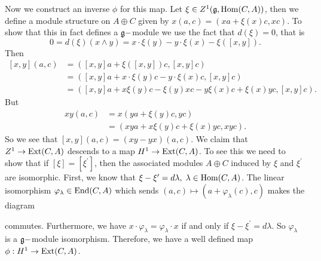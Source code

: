 Now we construct an inverse $\phi$ for this map. Let $\xi\in Z^1(\mathfrak{g},\text{Hom}(C,A))$, then we define a module structure on 
$A\oplus C$ given by $x(a,c)=(xa+\xi(x)c,xc)$. To show that this in fact defines a $\mathfrak{g}-$module we use the fact that 
$d(\xi)=0$, that is 
\begin{equation}
    0=d(\xi)(x\wedge y)=x\cdot\xi(y)-y\cdot \xi(x)-\xi([x,y]).
\end{equation}
Then 
\begin{equation}
    \begin{split}
        [x,y](a,c)&=([x,y]a+\xi([x,y])c,[x,y]c)\\
        &=([x,y]a+x\cdot\xi(y)c-y\cdot \xi(x)c,[x,y]c)\\
        &=([x,y]a+x\xi(y)c-\xi(y)xc-y\xi(x)c+\xi(x)yc,[x,y]c).
    \end{split}
\end{equation}
But 
\begin{equation}
    \begin{split}
        xy(a,c)&=x(ya+\xi(y)c,yc)\\
        &=(xya+x\xi(y)c+\xi(x)yc,xyc).
    \end{split}
\end{equation}
So we see that $[x,y](a,c)=(xy-yx)(a,c)$. We claim that $Z^1\to\text{Ext}(C,A)$ descends to a map $H^1\to \text{Ext}(C,A)$. To see this 
we need to show that if $[\xi]=[\xi^\prime]$, then the associated modules $A\oplus C$ induced by $\xi$ and $\xi^\prime$ are 
isomorphic. First, we know that $\xi-\xi^\prime =d\lambda,\;\lambda\in\text{Hom}(C,A)$. The linear isomorphism 
$\varphi_\lambda\in\text{End}(C,A)$ which sends $(a,c)\mapsto (a+\varphi_\lambda(c),c)$ makes the diagram  
\begin{center}
\end{center} 
commutes. Furthermore, we have $x\cdot\varphi_\lambda = \varphi_\lambda\cdot x$ if and only if $\xi-\xi^\prime = d\lambda$. 
So $\varphi_\lambda$ is a $\mathfrak{g}-$module isomorphism. Therefore, we have a well defined map $\phi:H^1\to\text{Ext}(C,A)$.\par 

